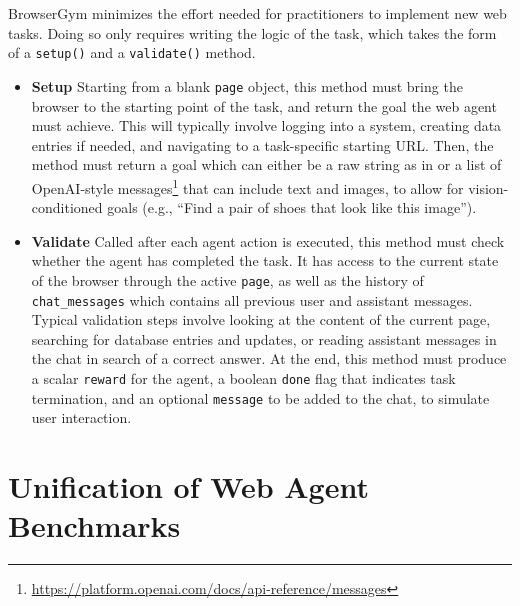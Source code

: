 \documentclass[10pt]{article} %
\begin{document}
BrowserGym minimizes the effort needed for practitioners to implement new web tasks. Doing so only requires writing the logic of the task, which takes the form of a \texttt{setup()} and a \texttt{validate()} method.
\begin{itemize}
    \item \textbf{Setup} Starting from a blank \texttt{page} object, this method must bring the browser to the starting point of the task, and return the goal the web agent must achieve. This will typically involve logging into a system, creating data entries if needed, and navigating to a task-specific starting URL. Then, the method must return a goal which can either be a raw string as in  or a list of OpenAI-style messages\footnote{\url{https://platform.openai.com/docs/api-reference/messages}} that can include text and images, to allow for vision-conditioned goals (e.g., ``Find a pair of shoes that look like this image'').

    \item \textbf{Validate} Called after each agent action is executed, this method must check whether the agent has completed the task. It has access to the current state of the browser through the active \texttt{page}, as well as the history of \texttt{chat\_messages} which contains all previous user and assistant messages. Typical validation steps involve looking at the content of the current page, searching for database entries and updates, or reading assistant messages in the chat in search of a correct answer. At the end, this method must produce a scalar \texttt{reward} for the agent, a boolean \texttt{done} flag that indicates task termination, and an optional \texttt{message} to be added to the chat, to simulate user interaction.
\end{itemize}


\section{Unification of Web Agent Benchmarks}
\label{sec:benchmarks}
\end{document}
